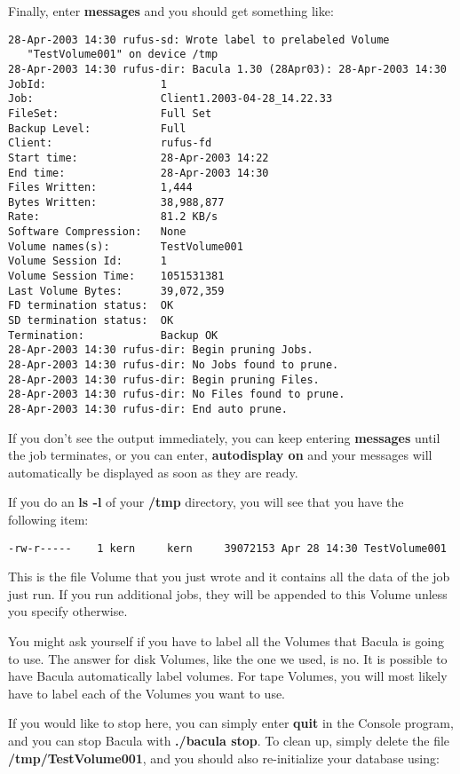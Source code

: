 Finally, enter {\bf messages} and you should get something like: 

\footnotesize
\begin{verbatim}
28-Apr-2003 14:30 rufus-sd: Wrote label to prelabeled Volume
   "TestVolume001" on device /tmp
28-Apr-2003 14:30 rufus-dir: Bacula 1.30 (28Apr03): 28-Apr-2003 14:30
JobId:                  1
Job:                    Client1.2003-04-28_14.22.33
FileSet:                Full Set
Backup Level:           Full
Client:                 rufus-fd
Start time:             28-Apr-2003 14:22
End time:               28-Apr-2003 14:30
Files Written:          1,444
Bytes Written:          38,988,877
Rate:                   81.2 KB/s
Software Compression:   None
Volume names(s):        TestVolume001
Volume Session Id:      1
Volume Session Time:    1051531381
Last Volume Bytes:      39,072,359
FD termination status:  OK
SD termination status:  OK
Termination:            Backup OK
28-Apr-2003 14:30 rufus-dir: Begin pruning Jobs.
28-Apr-2003 14:30 rufus-dir: No Jobs found to prune.
28-Apr-2003 14:30 rufus-dir: Begin pruning Files.
28-Apr-2003 14:30 rufus-dir: No Files found to prune.
28-Apr-2003 14:30 rufus-dir: End auto prune.
\end{verbatim}
\normalsize

If you don't see the output immediately, you can keep entering {\bf messages}
until the job terminates, or you can enter, {\bf autodisplay on} and your
messages will automatically be displayed as soon as they are ready. 

If you do an {\bf ls -l} of your {\bf /tmp} directory, you will see that you
have the following item: 

\footnotesize
\begin{verbatim}
-rw-r-----    1 kern     kern     39072153 Apr 28 14:30 TestVolume001
\end{verbatim}
\normalsize

This is the file Volume that you just wrote and it contains all the data of
the job just run. If you run additional jobs, they will be appended to this
Volume unless you specify otherwise. 

You might ask yourself if you have to label all the Volumes that Bacula is
going to use. The answer for disk Volumes, like the one we used, is no. It is
possible to have Bacula automatically label volumes. For tape Volumes, you
will most likely have to label each of the Volumes you want to use. 

If you would like to stop here, you can simply enter {\bf quit} in the Console
program, and you can stop Bacula with {\bf ./bacula stop}. To clean up, simply
delete the file {\bf /tmp/TestVolume001}, and you should also re-initialize
your database using: 

